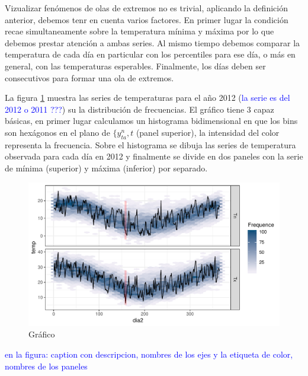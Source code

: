 \documentclass[12pt]{article}\usepackage[]{graphicx}\usepackage[]{color}
\makeatletter
\def\maxwidth{ %
  \ifdim\Gin@nat@width>\linewidth
    \linewidth
  \else
    \Gin@nat@width
  \fi
}
\newenvironment{knitrout}{}{} %
\makeatother
\begin{document}
Vizualizar fenómenos de olas de extremos no es trivial, aplicando la definición anterior, debemos tenr en cuenta varios factores. En primer lugar la condición recae simultaneamente sobre la temperatura mínima y máxima por lo que debemos prestar atención a ambas series. Al mismo tiempo debemos comparar la temperatura de cada día en particular con los percentiles para ese día, o más en general, con las temperaturas esperables. Finalmente, los días deben ser consecutivos para formar una ola de extremos. 

La figura \ref{fig:graf1} muestra las series de temperaturas para el año 2012 (\textcolor{blue}{la serie es del 2012 o 2011 ???}) su la distribución de frecuencias. El gráfico tiene 3 capaz básicas, en primer lugar calculamos un histograma bidimensional en que los bins son hexágonos en el plano de $\{ y^n_{ta}, t$ (panel superior), la intensidad del color representa la frecuencia. Sobre el histograma se dibuja las series de temperatura observada para cada día en 2012 y finalmente se divide en dos paneles con la serie de mínima (superior) y máxima (inferior) por separado. 

\begin{knitrout}
\color{fgcolor}\begin{figure}

{\centering \includegraphics[width=\maxwidth]{figure/graf1-1} 

}

\caption[Gráfico]{Gráfico}\label{fig:graf1}
\end{figure}


\end{knitrout}
\textcolor{blue}{en la figura: caption con descripcion, nombres de los ejes y la etiqueta de color, nombres de los paneles}
\end{document}
